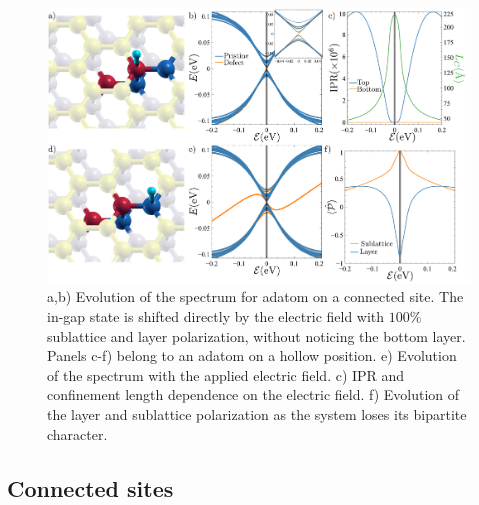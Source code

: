\begin{figure}[h!]
\centering
\includegraphics{defects/fig/hollow_connected.pdf}
\vspace{-20pt}
\caption{a,b) Evolution of the spectrum for adatom on a connected site. The in-gap state is shifted directly by the electric field with $100\%$ sublattice and layer polarization, without noticing the bottom layer. Panels c-f) belong to an adatom on a hollow position. e) Evolution of the spectrum with the applied electric field. c) IPR and confinement length dependence on the electric field. f) Evolution of the layer and sublattice polarization as the system loses its bipartite character.}
\label{Label}
\end{figure}
\FloatBarrier

\subsection{Connected sites}



























